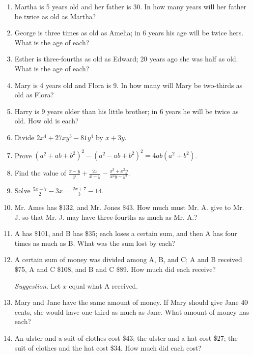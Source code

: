 \documentclass{book}
\begin{document}
\begin{enumerate}
\item Martha is 5 years old and her father is 30. In
how many years will her father be twice as old as Martha?

\item George is three times as old as Amelia; in 6 years
his age will be twice hers. What is the age of each?

\item Esther is three-fourths as old as Edward; 20 years
ago she was half as old. What is the age of each?

\item Mary is 4 years old and Flora is 9. In how many
will Mary be two-thirds as old as Flora?

\item Harry is 9 years older than his little brother; in
6 years he will be twice as old. How old is each?

\item Divide $2x^4+27xy^3-81y^4$ by $x+3y$.

\item Prove $\left(a^2+ab+b^2\right)^2-\left(a^2-ab+b^2\right)^2=4ab(a^2+b^2)$.

\item Find the value of $\displaystyle
\frac{x-y}{y}+\frac{2x}{x-y}-\frac{x^3+x^2y}{x^2y-y^3}$.

\item Solve $\displaystyle \frac{5x-7}{2}-3x=\frac{2x+7}{3}-14$.

\item Mr. Ames has \$132, and Mr. Jones \$43. How
much must Mr. A. give to Mr. J. so that Mr. J. may have
three-fourths as much as Mr. A.?

\item A has \$101, and B has \$35; each loses a certain
sum, and then A has four times as much as B. What was
the sum lost by each?

\item A certain sum of money was divided among A, B, and C; A and B
received \$75, A and C \$108, and B and C \$89. How much did each
receive?

\textit{ Suggestion}. Let $x$ equal what A received.

\item Mary and Jane have the same amount of money.
If Mary should give Jane 40 cents, she would have one-third
as much as Jane. What amount of money has
each?

\item An ulster and a suit of clothes cost \$43; the ulster and a
hat cost \$27; the suit of clothes and the hat cost \$34. How much
did each cost?


\end{enumerate}
\end{document}

